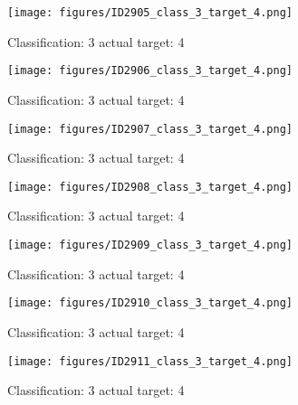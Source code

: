 \begin{figure}[h!]
\begin{center}
\texttt{[image: figures/ID2905\_class\_3\_target\_4.png]}
\end{center}
\caption{ Classification: 3 actual target: 4}
\label{fig:ID2905_class_3_target_4}
\end{figure}
\begin{figure}[h!]
\begin{center}
\texttt{[image: figures/ID2906\_class\_3\_target\_4.png]}
\end{center}
\caption{ Classification: 3 actual target: 4}
\label{fig:ID2906_class_3_target_4}
\end{figure}
\begin{figure}[h!]
\begin{center}
\texttt{[image: figures/ID2907\_class\_3\_target\_4.png]}
\end{center}
\caption{ Classification: 3 actual target: 4}
\label{fig:ID2907_class_3_target_4}
\end{figure}
\begin{figure}[h!]
\begin{center}
\texttt{[image: figures/ID2908\_class\_3\_target\_4.png]}
\end{center}
\caption{ Classification: 3 actual target: 4}
\label{fig:ID2908_class_3_target_4}
\end{figure}
\begin{figure}[h!]
\begin{center}
\texttt{[image: figures/ID2909\_class\_3\_target\_4.png]}
\end{center}
\caption{ Classification: 3 actual target: 4}
\label{fig:ID2909_class_3_target_4}
\end{figure}
\begin{figure}[h!]
\begin{center}
\texttt{[image: figures/ID2910\_class\_3\_target\_4.png]}
\end{center}
\caption{ Classification: 3 actual target: 4}
\label{fig:ID2910_class_3_target_4}
\end{figure}
\begin{figure}[h!]
\begin{center}
\texttt{[image: figures/ID2911\_class\_3\_target\_4.png]}
\end{center}
\caption{ Classification: 3 actual target: 4}
\label{fig:ID2911_class_3_target_4}
\end{figure}
